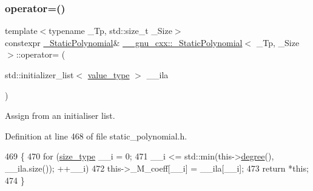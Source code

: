 \subsubsection{\texorpdfstring{operator=()}{operator=()}\hspace{0.1cm}{\footnotesize\ttfamily [3/3]}}
{\footnotesize\ttfamily template$<$typename \+\_\+\+Tp, std\+::size\+\_\+t \+\_\+\+Size$>$ \\
constexpr \hyperlink{class____gnu__cxx_1_1__StaticPolynomial}{\+\_\+\+Static\+Polynomial}\& \hyperlink{class____gnu__cxx_1_1__StaticPolynomial}{\+\_\+\+\_\+gnu\+\_\+cxx\+::\+\_\+\+Static\+Polynomial}$<$ \+\_\+\+Tp, \+\_\+\+Size $>$\+::operator= (\begin{DoxyParamCaption}\item[{std\+::initializer\+\_\+list$<$ \hyperlink{class____gnu__cxx_1_1__StaticPolynomial_aad5f3d6d5876b6926b30724aeac649d6}{value\+\_\+type} $>$}]{\+\_\+\+\_\+ila }\end{DoxyParamCaption})\hspace{0.3cm}{\ttfamily [inline]}}

Assign from an initialiser list. 

Definition at line 468 of file static\+\_\+polynomial.\+h.


\begin{DoxyCode}
469       \{
470         \textcolor{keywordflow}{for} (\hyperlink{class____gnu__cxx_1_1__StaticPolynomial_a0cc0aa4adab35686ef2474e07f511ff9}{size\_type} \_\_i = 0;
471              \_\_i <= std::min(this->\hyperlink{class____gnu__cxx_1_1__StaticPolynomial_a5977dac3a84e8a43f3e9da28b62ca46a}{degree}(), \_\_ila.size()); ++\_\_i)
472           this->\_M\_coeff[\_\_i] = \_\_ila[\_\_i];
473         \textcolor{keywordflow}{return} *\textcolor{keyword}{this};
474       \}
\end{DoxyCode}
\mbox{\label{class____gnu__cxx_1_1__StaticPolynomial_a2846303c230947a0cd31fdc0322c14c7}} 

